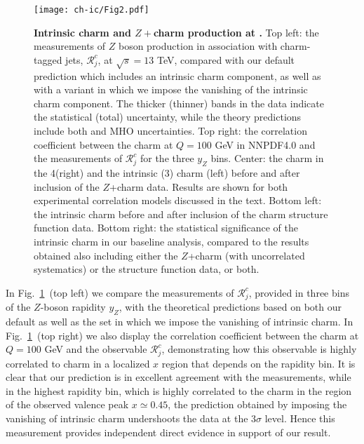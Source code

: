 \begin{figure}[htbp]
  \begin{center}
    \texttt{[image: ch-ic/Fig2.pdf]}
     \caption{\small
       \textbf{ Intrinsic charm and $Z+$charm production at \lhcb.}
       Top left: the \lhcb measurements of $Z$ boson production
      in association with charm-tagged jets, $\mathcal{R}_j^c$, at $\sqrt{s}=13$ TeV,  compared with
      our default prediction which includes an intrinsic charm component,
      as well as with a variant in which we impose the
      vanishing of the intrinsic charm component.
       The thicker (thinner) bands in the \lhcb data indicate the statistical
      (total) uncertainty, while the theory predictions include both \pdf and MHO uncertainties.
      Top right: the correlation coefficient between
     the  charm \pdf at $Q=100$ GeV in NNPDF4.0
      and the \lhcb measurements of $\mathcal{R}_j^c$ 
     for the three $y_Z$ bins.
     Center: the charm \pdf
     in the 4\fns (right) and the intrinsic (3\fns) charm \pdf (left)
     before and after inclusion of the \lhcb $Z$+charm data.
     Results are shown
     for both experimental correlation models discussed in the text.
     Bottom left: the intrinsic charm \pdf before and after inclusion
     of the \emc charm structure function data.
     Bottom right: the statistical significance of the
     intrinsic charm \pdf in our baseline analysis, compared to the results
     obtained also including either the \lhcb $Z$+charm (with uncorrelated
     systematics) or the \emc
     structure function data, or both.
  \label{fig:ic/Zc} }
\end{center}
\end{figure}

In Fig.~\ref{fig:ic/Zc}~(top left) we compare the \lhcb measurements of $\mathcal{R}_j^c$, provided
in three bins of the $Z$-boson rapidity
$y_Z$, with the theoretical predictions
 based on both our default \pdfs as well as the \pdf set in
 which we impose the vanishing of intrinsic charm.
 In Fig.~\ref{fig:ic/Zc}~(top right)
we also display the  correlation coefficient between
 the  charm \pdf at $Q=100$ GeV 
 and the observable  $\mathcal{R}_j^c$, demonstrating how this observable
 is highly
 correlated to charm in a localized
 $x$ region that depends on the rapidity bin.
 It is clear that
 our prediction is in excellent agreement with the \lhcb measurements, while in the
 highest rapidity bin, which is highly correlated to the charm \pdf in
 the region of the observed valence peak $x\simeq 0.45$, the prediction
 obtained by imposing the vanishing of intrinsic charm undershoots the
 data at the $3\sigma$ level.
%
 Hence this measurement provides
 independent direct evidence in support of our result.

